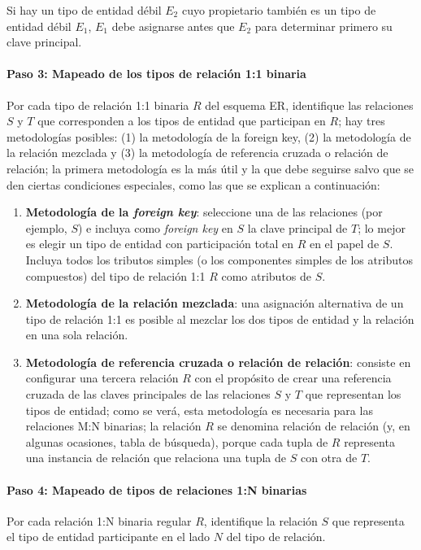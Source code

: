 Si hay un tipo de entidad débil $E_{2}$ cuyo propietario también es un tipo de entidad débil $E_{1}$, $E_{1}$ debe asignarse antes que $E_{2}$ para determinar primero su clave principal.


\paragraph*{Paso 3: Mapeado de los tipos de relación 1:1 binaria}

Por cada tipo de relación 1:1 binaria $R$ del esquema ER, identifique las relaciones $S$ y $T$ que corresponden a los tipos de entidad que participan en $R$; hay tres metodologías posibles: (1) la metodología de la foreign key, (2) la metodología de la relación mezclada y (3) la metodología de referencia cruzada o relación de relación; la primera metodología es la más útil y la que debe seguirse salvo que se den ciertas condiciones especiales, como las que se explican a continuación:

\begin{enumerate}
    \renewcommand\labelenumi{\bfseries\theenumi}
    \item \textbf{Metodología de la \textit{foreign key}}: seleccione una de las relaciones (por ejemplo, $S$) e incluya como \textit{foreign key} en $S$ la clave principal de $T$; lo mejor es elegir un tipo de entidad con participación total en $R$ en el papel de $S$. Incluya todos los tributos simples (o los componentes simples de los atributos compuestos) del tipo de relación 1:1 $R$ como atributos de $S$.
    
    \item \textbf{Metodología de la relación mezclada}:  una asignación alternativa de un tipo de relación 1:1 es posible al mezclar los dos tipos de entidad y la relación en una sola relación. 
    
    \item \textbf{Metodología de referencia cruzada o relación de relación}: consiste en configurar una tercera relación $R$ con el propósito de crear una referencia cruzada de las claves principales de las relaciones $S$ y $T$ que representan los tipos de entidad; como se verá, esta metodología es necesaria para las relaciones M:N binarias; la relación $R$ se denomina relación de relación (y, en algunas ocasiones, tabla de búsqueda), porque cada tupla de $R$ representa una instancia de relación que relaciona una tupla de $S$ con otra de $T$.
\end{enumerate}

\paragraph*{Paso 4: Mapeado de tipos de relaciones 1:N binarias}
Por cada relación 1:N binaria regular $R$, identifique la relación $S$ que representa el tipo de entidad participante en el lado $N$ del tipo de relación. 



